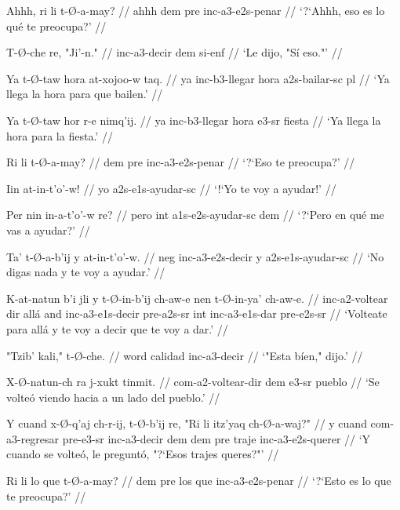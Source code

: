 \documentclass[12pt]{article}
\begin{document}
\ex
\begingl
  \gla  Ahhh, ri li t-\O-a-may? //
  \glb ahhh dem pre inc-a3-e2s-penar //
  \glft `?`Ahhh, eso es lo qu\'e te preocupa?' //
\endgl
\xe

\ex
\begingl
  \gla  T-\O-che re, "Ji'-n." //
  \glb inc-a3-decir dem si-enf //
  \glft `Le dijo, "S\'i eso."' //
\endgl
\xe

\ex
\begingl
  \gla  Ya t-\O-taw hora at-xojoo-w taq. //
  \glb ya inc-b3-llegar hora a2s-bailar-sc pl //
  \glft `Ya llega la hora para que bailen.' //
\endgl
\xe

\ex
\begingl
  \gla  Ya t-\O-taw hor r-e nimq'ij. //
  \glb ya inc-b3-llegar hora e3-sr fiesta //
  \glft `Ya llega la hora para la fiesta.' //
\endgl
\xe

\ex
\begingl
  \gla  Ri li t-\O-a-may? //
  \glb dem pre inc-a3-e2s-penar //
  \glft `?`Eso te preocupa?' //
\endgl
\xe

\ex
\begingl
  \gla Iin at-in-t'o'-w! //
  \glb yo a2s-e1s-ayudar-sc //
  \glft `!`Yo te voy a ayudar!' //
\endgl
\xe

\ex
\begingl
  \gla Per nin in-a-t'o'-w re? //
  \glb pero int a1s-e2s-ayudar-sc dem //
  \glft `?`Pero en qu\'e me vas a ayudar?' //
\endgl
\xe

\ex
\begingl
  \gla  Ta' t-\O-a-b'ij y at-in-t'o'-w. //
  \glb neg inc-a3-e2s-decir y a2s-e1s-ayudar-sc //
  \glft `No digas nada y te voy a ayudar.' //
\endgl
\xe

\ex
\begingl
  \gla K-at-natun b'i jli y t-\O-in-b'ij ch-aw-e nen t-\O-in-ya' ch-aw-e. //
  \glb inc-a2-voltear dir all\'a and inc-a3-e1s-decir pre-a2s-sr int inc-a3-e1s-dar pre-e2s-sr //
  \glft `Volteate para all\'a y te voy a decir que te voy a dar.' //
\endgl
\xe

\ex
\begingl
  \gla  "Tzib' kali," t-\O-che. //
  \glb word calidad inc-a3-decir //
  \glft `"Esta b\'ien," dijo.' //
\endgl
\xe

\ex
\begingl
  \gla  X-\O-natun-ch ra j-xukt tinmit. //
  \glb com-a2-voltear-dir dem e3-sr pueblo //
  \glft `Se volte\'o viendo hacia a un lado del pueblo.' //
\endgl
\xe

\ex
\begingl
  \gla  Y cuand x-\O-q'aj ch-r-ij, t-\O-b'ij re, "Ri li itz'yaq ch-\O-a-waj?" //
  \glb  y cuand com-a3-regresar pre-e3-sr inc-a3-decir dem dem pre traje inc-a3-e2s-querer //
  \glft `Y cuando se volte\'o, le pregunt\'o, "?`Esos trajes queres?"' //
\endgl
\xe

\ex
\begingl
  \gla  Ri li lo que t-\O-a-may? //
  \glb dem pre los que inc-a3-e2s-penar //
  \glft `?`Esto es lo que te preocupa?' //
\endgl
\xe
\end{document}

